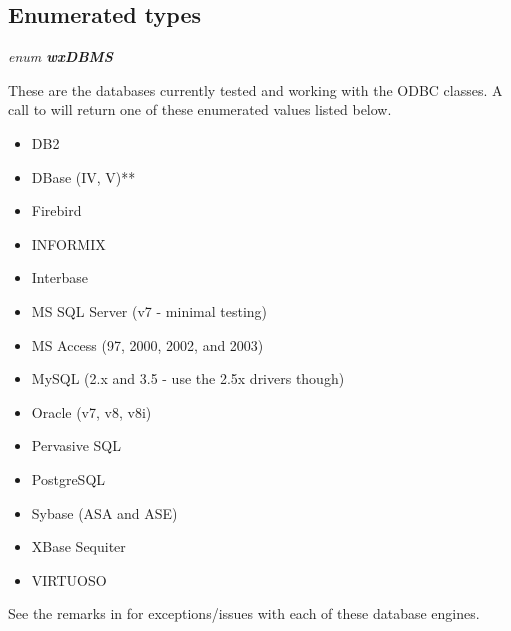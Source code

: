 \subsection{Enumerated types}\label{wxdbenumeratedtypes}



{\it enum {\bf wxDBMS}}

These are the databases currently tested and working with the ODBC classes.  A call to  will return one of these enumerated values listed below.

\begin{itemize}\itemsep=0pt
\item DB2
\item DBase (IV, V)**
\item Firebird
\item INFORMIX
\item Interbase
\item MS SQL Server (v7 - minimal testing)
\item MS Access (97, 2000, 2002, and 2003)
\item MySQL (2.x and 3.5 - use the 2.5x drivers though)
\item Oracle (v7, v8, v8i)
\item Pervasive SQL
\item PostgreSQL
\item Sybase (ASA and ASE)
\item XBase Sequiter
\item VIRTUOSO
\end{itemize}

See the remarks in  for exceptions/issues with each of these database engines.




